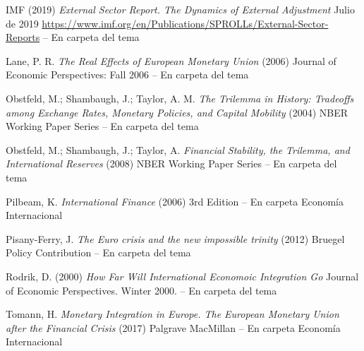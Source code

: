 \documentclass{nuevotema}
\begin{document}
IMF (2019) \textit{External Sector Report. The Dynamics of External Adjustment} Julio de 2019 \url{https://www.imf.org/en/Publications/SPROLLs/External-Sector-Reports} -- En carpeta del tema

Lane, P. R. \textit{The Real Effects of European Monetary Union} (2006) Journal of Economic Perspectives: Fall 2006 -- En carpeta del tema

Obstfeld, M.; Shambaugh, J.; Taylor, A. M. \textit{The Trilemma in History: Tradeoffs among Exchange Rates, Monetary Policies, and Capital Mobility} (2004) NBER Working Paper Series -- En carpeta del tema

Obstfeld, M.; Shambaugh, J.; Taylor, A. \textit{Financial Stability, the Trilemma, and International Reserves} (2008) NBER Working Paper Series -- En carpeta del tema

Pilbeam, K. \textit{International Finance} (2006) 3rd Edition -- En carpeta Economía Internacional

Pisany-Ferry, J. \textit{The Euro crisis and the new impossible trinity} (2012) Bruegel Policy Contribution -- En carpeta del tema

Rodrik, D. (2000) \textit{How Far Will International Economoic Integration Go} Journal of Economic Perspectives. Winter 2000. -- En carpeta del tema

Tomann, H. \textit{Monetary Integration in Europe. The European Monetary Union after the Financial Crisis} (2017) Palgrave MacMillan -- En carpeta Economía Internacional
\end{document}
